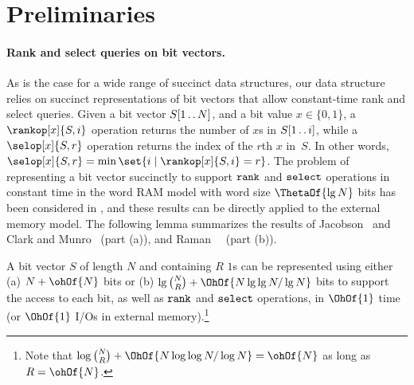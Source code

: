 {%
\section{Preliminaries}

\paragraph{Rank and select queries on bit vectors.}

As is the case for a wide range of succinct data structures, our data
structure relies on succinct representations of bit vectors
that allow constant-time rank and select queries.
Given a bit vector $S[1 \mathinner{\ldotp\ldotp} N]$, and a bit value $x \in \{0, 1\}$, a
$\rankop[x]{S, i}$ operation returns the number of $x$s in $S[1 \mathinner{\ldotp\ldotp}
i]$, while a $\selop[x]{S, r}$ operation returns the index of the
$r$th $x$ in~$S$.
In other words, $\selop[x]{S, r} = \min \set{i \mid \rankop[x]{S, i} = r}$.
The problem of representing a bit vector succinctly to support
$\texttt{rank}$ and $\texttt{select}$ operations in constant time in the word RAM model
with word size $\ThetaOf{\lg N}$ bits has been considered in
\cite{jac_1989,clark_96, DBLP:journals/talg/RamanRS07}, and these results can be
directly applied to the external memory model.
The following lemma summarizes the results of Jacobson~\cite{jac_1989} and
Clark and Munro~\cite{clark_96} (part (a)), and
Raman~\etal~\cite{DBLP:journals/talg/RamanRS07} (part (b)).

\begin{lemma}
  \label{lem:rank_select}
  A bit vector $S$ of length $N$ and containing $R$ $1$s can be
  represented using either (a) $N + \ohOf{N}$ bits or (b) $\lg \binom{N}{R}
  + \OhOf{N \lg \lg N / \lg N}$ bits to support the access to each bit, as
  well as $\texttt{rank}$ and $\texttt{select}$ operations, in $\OhOf{1}$ time (or
  $\OhOf{1}$ I/Os in external memory).\footnote{Note that $\log \binom{N}{R} +
    \OhOf{N \log \log N / \log N} = \ohOf{N}$ as long as $R = \ohOf{N}$.}
\end{lemma}

}
